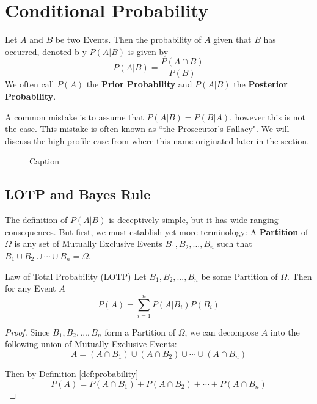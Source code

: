 \documentclass{report}
\begin{document}
\section{Conditional Probability}
Let $A$ and $B$ be two Events. Then the probability of $A$ given that $B$ has occurred, denoted b y $P(A\vert B)$ is given by
\[
    P(A\vert B)=\frac{P(A\cap B)}{P(B)}
\]
We often call $P(A)$ the \textbf{Prior Probability} and $P(A\vert B)$ the \textbf{Posterior Probability}.
\begin{notsofast}
    A common mistake is to assume that $P(A\vert B)=P(B\vert A)$, however this is not the case. This mistake is often known as ``the Prosecutor's Fallacy". We will discuss the high-profile case from where this name originated later in the section.
\end{notsofast}

\begin{figure}
    \centering
    \includsvg{}
    \caption{Caption}
    \label{fig:my_label}
\end{figure}

\subsection{LOTP and Bayes Rule}
The definition of $P(A\vert B)$ is deceptively simple, but it has wide-ranging consequences. But first, we must establish yet more terminology: A \textbf{Partition} of $\Omega$ is any set of Mutually Exclusive Events $B_1,B_2,...,B_n$ such that $B_1\cup B_2\cup\cdots \cup B_n=\Omega$.

\begin{theorem}{Law of Total Probability (LOTP)}
Let $B_1,B_2,...,B_n$ be some Partition of $\Omega$. Then for any Event $A$
\[
    P(A)=\sum_{i=1}^n P(A\vert B_i) P(B_i)
\]
\tcblower
\begin{proof}
    Since $B_1,B_2,...,B_n$ form a Partition of $\Omega$, we can decompose $A$ into the following union of Mutually Exclusive Events:
    \[
        A=(A\cap B_1)\cup (A\cap B_2) \cup \cdots \cup (A\cap B_n)
    \]
    \begin{center}
        
    \end{center}
    Then by Definition \ref{def:probability}
    \[
        P(A)=P(A\cap B_1)+ P(A\cap B_2)+ \cdots + P(A\cap B_n)
    \]
\end{proof}
\end{theorem}
\end{document}
